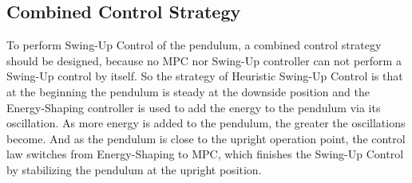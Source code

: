\subsection{Combined Control Strategy}
To perform Swing-Up Control of the pendulum, a combined control strategy should be designed, because no MPC nor Swing-Up controller can not perform a Swing-Up control by itself. So the strategy of Heuristic Swing-Up Control is that at the beginning the pendulum is steady at the downside position and the Energy-Shaping controller is used to add the energy to the pendulum via its oscillation. As more energy is added to the pendulum, the greater the oscillations become. And as the pendulum is close to the upright operation point, the control law switches from Energy-Shaping to MPC, which finishes the Swing-Up Control by stabilizing the pendulum at the upright position.
\newpage
